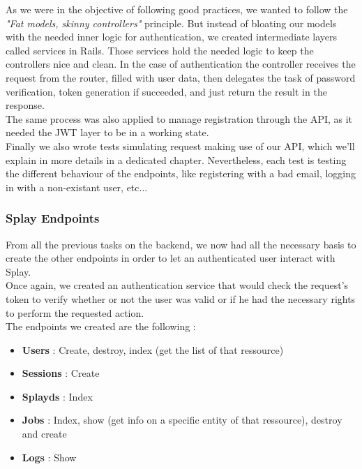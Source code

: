 \documentclass{eplmastersthesis}
\begin{document}
          As we were in the objective of following good practices, we wanted
          to follow the \textit{"Fat models, skinny controllers"} principle.
          But instead of bloating our models with the needed inner logic for
          authentication, we created intermediate layers called services
          in Rails. Those services hold the needed logic to keep the controllers
          nice and clean. In the case of authentication the controller receives
          the request from the router, filled with user data, then delegates
          the task of password verification, token generation if succeeded,
          and just return the result in the response.\\

          The same process was also applied to manage registration through
          the API, as it needed the JWT layer to be in a working state.\\

          Finally we also wrote tests simulating request making use of our
          API, which we'll explain in more details in a dedicated chapter.
          Nevertheless, each test is testing the different behaviour of
          the endpoints, like registering with a bad email, logging in with
          a non-existant user, etc...

        \subsubsection{Splay Endpoints}

          From all the previous tasks on the backend, we now had all the
          necessary basis to create the other endpoints in order to let
          an authenticated user interact with Splay.\\

          Once again, we created an authentication service that would check
          the request's token to verify whether or not the user was valid or
          if he had the necessary rights to perform the requested action.\\

          The endpoints we created are the following :

          \begin{itemize}
            \item \textbf{Users} : Create, destroy, index (get the list of that
            ressource)
            \item \textbf{Sessions} : Create
            \item \textbf{Splayds} : Index
            \item \textbf{Jobs} : Index, show (get info on a specific entity
            of that ressource), destroy and create
            \item \textbf{Logs} : Show
          \end{itemize}
\end{document}
